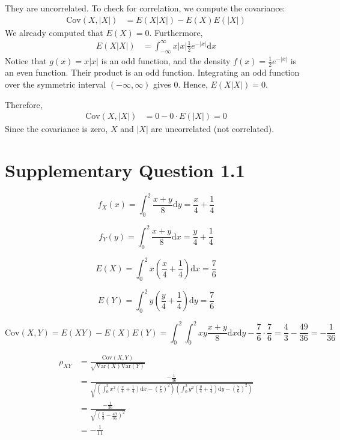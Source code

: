 \documentclass[a4paper, UTF-8]{article}
\theoremstyle{plain}
\begin{document}
They are uncorrelated. To check for correlation, we compute the covariance:
\begin{align*}
\text{Cov}(X, |X|) & = E(X|X|) - E(X)E(|X|)
\end{align*}
We already computed that $E(X) = 0$. Furthermore,
\begin{align*}
E(X|X|) & = \int_{-\infty}^{\infty} x|x| \frac{1}{2} e^{-|x|} \mathrm{d}x
\end{align*}
Notice that $g(x) = x|x|$ is an odd function, and the density $f(x) = \frac{1}{2} e^{-|x|}$ is an even function. Their product is an odd function. Integrating an odd function over the symmetric interval $(-\infty, \infty)$ gives $0$. Hence, $E(X|X|) = 0$. 

Therefore,
\begin{align*}
\text{Cov}(X, |X|) & = 0 - 0 \cdot E(|X|) = 0 
\end{align*}
Since the covariance is zero, $X$ and $|X|$ are uncorrelated (not correlated).

\section{Supplementary Question 1.1} 

$$
f_X(x) = \int_{0}^{2} \frac{x+y}{8} \mathrm{d}y = \frac{x}{4} + \frac{1}{4}
$$

$$
f_Y(y) = \int_{0}^{2} \frac{x+y}{8} \mathrm{d}x = \frac{y}{4} + \frac{1}{4}
$$

$$
E(X) = \int_{0}^{2} x\left(\frac{x}{4} + \frac{1}{4}\right) \mathrm{d}x = \frac{7}{6}
$$

$$
E(Y) = \int_{0}^{2} y\left(\frac{y}{4} + \frac{1}{4}\right) \mathrm{d}y = \frac{7}{6} 
$$

$$
\text{Cov}(X, Y) = E(XY) - E(X)E(Y) = \int_{0}^{2}\int_{0}^{2} xy \frac{x+y}{8} \mathrm{d}x\mathrm{d}y - \frac{7}{6}\cdot\frac{7}{6} = \frac{4}{3} - \frac{49}{36} = -\frac{1}{36}
$$

\begin{align*}
\rho_{XY} &= \frac{\text{Cov}(X, Y)}{\sqrt{\text{Var}(X)\text{Var}(Y)}} \\ 
&= \frac{-\frac{1}{36}}{\sqrt{\left(\int_{0}^{2} x^2\left(\frac{x}{4} + \frac{1}{4}\right) \mathrm{d}x - \left(\frac{7}{6}\right)^2\right)\left(\int_{0}^{2} y^2\left(\frac{y}{4} + \frac{1}{4}\right) \mathrm{d}y - \left(\frac{7}{6}\right)^2\right)}} \\ 
&= \frac{-\frac{1}{36}}{\sqrt{\left(\frac{5}{3} - \frac{49}{36}\right)^2}} \\ 
& = -\frac{1}{11}
\end{align*}
\end{document}
